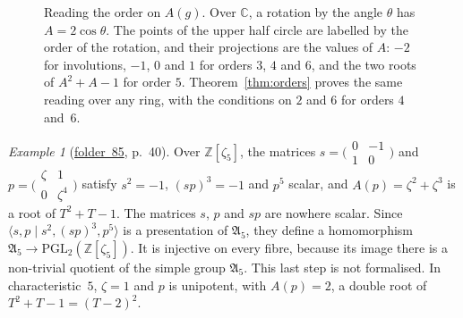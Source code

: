 \documentclass[11pt,a4paper]{amsart}
\theoremstyle{definition}
\theoremstyle{remark}
\newtheorem{example}[theorem]{Example}
\newcommand{\Z}{\mathbb Z}
\newcommand{\PGL}{\mathrm{PGL}_2}
\newcommand{\fac}[1]{\href{https://grothendieck.umontpellier.fr/#1.pdf}{folder~#1}}
\begin{document}
\begin{figure}[ht]
\centering
{}
\caption{Reading the order on $A(g)$. Over $\mathbb C$, a rotation by the angle $\theta$ has $A = 2\cos\theta$. The points of the upper half circle are labelled by the order of the rotation, and their projections are the values of $A$: $-2$ for involutions, $-1$, $0$ and $1$ for orders $3$, $4$ and $6$, and the two roots of $A^2 + A - 1$ for order $5$. Theorem~\ref{thm:orders} proves the same reading over any ring, with the conditions on $2$ and $6$ for orders $4$ and~$6$.}
\label{fig:orders}
\end{figure}

\begin{example}[\fac{85}, p.~40]
Over $\Z[\zeta_5]$, the matrices $s = \bigl(\begin{smallmatrix} 0 & -1 \\ 1 & 0\end{smallmatrix}\bigr)$ and $p = \bigl(\begin{smallmatrix} \zeta & 1 \\ 0 & \zeta^4\end{smallmatrix}\bigr)$ satisfy $s^2 = -1$, $(sp)^3 = -1$ and $p^5$ scalar, and $A(p) = \zeta^2 + \zeta^3$ is a root of $T^2 + T - 1$. The matrices $s$, $p$ and $sp$ are nowhere scalar. Since $\langle s, p \mid s^2, (sp)^3, p^5\rangle$ is a presentation of $\mathfrak A_5$, they define a homomorphism $\mathfrak A_5 \to \PGL(\Z[\zeta_5])$. It is injective on every fibre, because its image there is a non-trivial quotient of the simple group $\mathfrak A_5$. This last step is not formalised. In characteristic~$5$, $\zeta = 1$ and $p$ is unipotent, with $A(p) = 2$, a double root of $T^2 + T - 1 = (T - 2)^2$.
\end{example}
\end{document}
